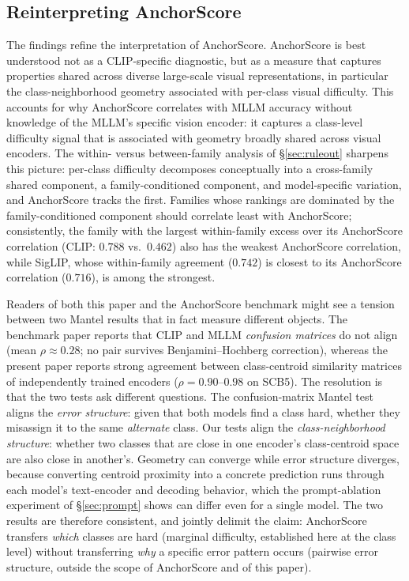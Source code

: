 \documentclass[a4paper,fleqn]{cas-sc}
\begin{document}
\subsection{Reinterpreting AnchorScore}

The findings refine the interpretation of AnchorScore. AnchorScore is best understood not as a CLIP-specific diagnostic, but as a measure that captures properties shared across diverse large-scale visual representations, in particular the class-neighborhood geometry associated with per-class visual difficulty. This accounts for why AnchorScore correlates with MLLM accuracy without knowledge of the MLLM's specific vision encoder: it captures a class-level difficulty signal that is associated with geometry broadly shared across visual encoders. The within- versus between-family analysis of \S\ref{sec:ruleout} sharpens this picture: per-class difficulty decomposes conceptually into a cross-family shared component, a family-conditioned component, and model-specific variation, and AnchorScore tracks the first. Families whose rankings are dominated by the family-conditioned component should correlate least with AnchorScore; consistently, the family with the largest within-family excess over its AnchorScore correlation (CLIP: $0.788$ vs.\ $0.462$) also has the weakest AnchorScore correlation, while SigLIP, whose within-family agreement ($0.742$) is closest to its AnchorScore correlation ($0.716$), is among the strongest.

Readers of both this paper and the AnchorScore benchmark \cite{ma2025anchorscore} might see a tension between two Mantel results that in fact measure different objects. The benchmark paper reports that CLIP and MLLM \emph{confusion matrices} do not align (mean $\rho\approx0.28$; no pair survives Benjamini--Hochberg correction), whereas the present paper reports strong agreement between class-centroid similarity matrices of independently trained encoders ($\rho=0.90$--$0.98$ on SCB5). The resolution is that the two tests ask different questions. The confusion-matrix Mantel test aligns the \emph{error structure}: given that both models find a class hard, whether they misassign it to the same \emph{alternate} class. Our tests align the \emph{class-neighborhood structure}: whether two classes that are close in one encoder's class-centroid space are also close in another's. Geometry can converge while error structure diverges, because converting centroid proximity into a concrete prediction runs through each model's text-encoder and decoding behavior, which the prompt-ablation experiment of \S\ref{sec:prompt} shows can differ even for a single model. The two results are therefore consistent, and jointly delimit the claim: AnchorScore transfers \emph{which} classes are hard (marginal difficulty, established here at the class level) without transferring \emph{why} a specific error pattern occurs (pairwise error structure, outside the scope of AnchorScore and of this paper).
\end{document}
